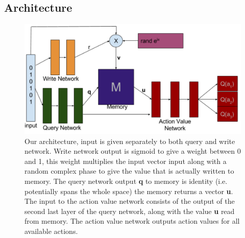\documentclass{article}
\begin{document}
\subsection*{Architecture}
\begin{figure}[!ht]
\includegraphics[width=1\textwidth]{images/architecture.png}
\caption{Our architecture, input is given separately to both query and write network. Write network output is sigmoid to give a weight between 0 and 1, this weight multiplies the input vector input along with a random complex phase to give the value that is actually written to memory. The query network output \textbf{q} to memory is identity (i.e. potentially spans the whole space) the memory returns a vector \textbf{u}. The input to the action value network consists of the output of the second last layer of the query network, along with the value \textbf{u} read from memory. The action value network outputs action values for all available actions.  }
\label{fig:arch}
\end{figure}
\end{document}
